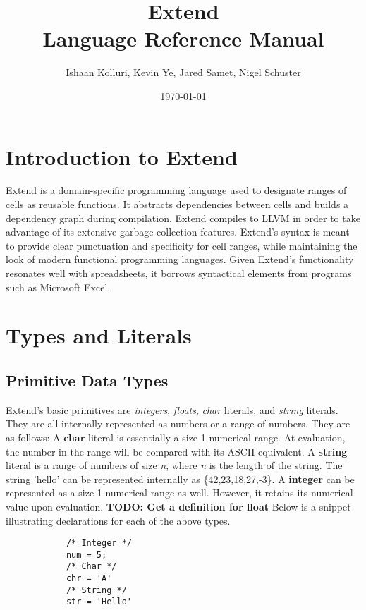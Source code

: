 \documentclass[titlepage]{article}
\title{Extend\\ Language Reference Manual}
\author{Ishaan Kolluri, Kevin Ye, Jared Samet, Nigel Schuster}
\date{\today}
\begin{document}
\maketitle
\tableofcontents
\section{Introduction to Extend}
Extend is a domain-specific programming language used to designate ranges of cells as reusable functions. It abstracts dependencies between cells and builds a dependency graph during compilation. Extend compiles to LLVM in order to take advantage of its extensive garbage collection features.
\newline
Extend's syntax is meant to provide clear punctuation and specificity for cell ranges, while maintaining the look of modern functional programming languages. Given Extend's functionality resonates well with spreadsheets, it borrows syntactical elements from programs such as Microsoft Excel.
\section{Types and Literals}
	\subsection{Primitive Data Types}
		Extend's basic primitives are \textit{integers}, \textit{floats}, \textit{char} literals, and \textit{string} literals. They are all internally represented as numbers or a range of numbers. They are as follows:
		\newline
		A \textbf{char} literal is essentially a size 1 numerical range. At evaluation, the number in the range will be compared with its ASCII equivalent.
  		\newline
  		A \textbf{string} literal is a range of numbers of size \textit{n}, where \textit{n} is the length of the string. The string 'hello' can be represented internally as \{42,23,18,27,-3\}.
		A \textbf{integer} can be represented as a size 1 numerical range as well. However, it retains its numerical value upon evaluation. 
		\newline
		\textbf{TODO: Get a definition for float }
		\newline
		Below is a snippet illustrating declarations for each of the above types.
  		\begin{lstlisting}
			/* Integer */
  			num = 5;
			/* Char */
			chr = 'A'
			/* String */
			str = 'Hello'
  		\end{lstlisting}
\end{document}
